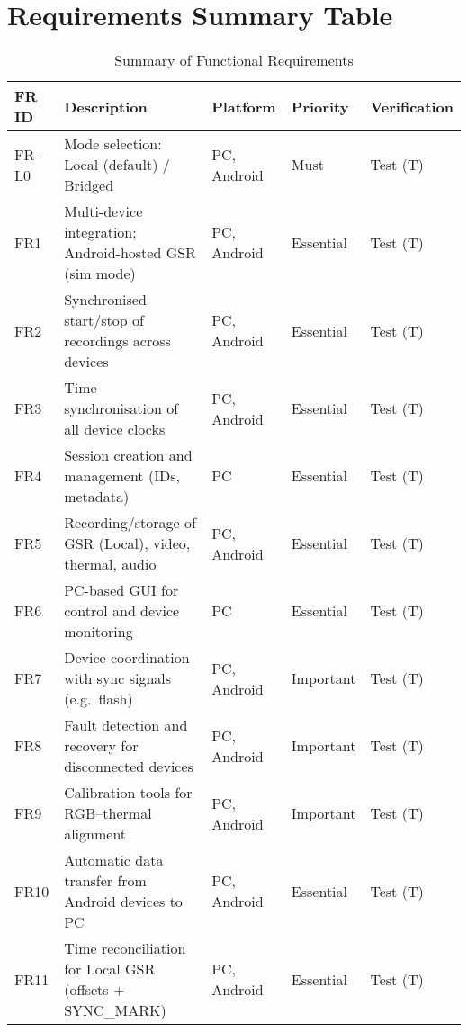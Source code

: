\documentclass{report}
\begin{document}
    \section{Requirements Summary Table}
    \begin{table}[h!]
        \centering
        \caption{Summary of Functional Requirements}
        \label{tab:fr_summary}
        \begin{tabular}{@{}lllll@{}}
            \toprule
            \textbf{FR ID} & \textbf{Description} & \textbf{Platform} & \textbf{Priority} & \textbf{Verification} \\ \midrule
            FR-L0 & Mode selection: Local (default) / Bridged & PC, Android & Must & Test (T) \\
            FR1 & Multi-device integration; Android-hosted GSR (sim mode) & PC, Android & Essential & Test (T) \\
            FR2 & Synchronised start/stop of recordings across devices & PC, Android & Essential & Test (T) \\
            FR3 & Time synchronisation of all device clocks & PC, Android & Essential & Test (T) \\
            FR4 & Session creation and management (IDs, metadata) & PC & Essential & Test (T) \\
            FR5 & Recording/storage of GSR (Local), video, thermal, audio & PC, Android & Essential & Test (T) \\
            FR6 & PC-based GUI for control and device monitoring & PC & Essential & Test (T) \\
            FR7 & Device coordination with sync signals (e.g.\ flash) & PC, Android & Important & Test (T) \\
            FR8 & Fault detection and recovery for disconnected devices & PC, Android & Important & Test (T) \\
            FR9 & Calibration tools for RGB–thermal alignment & PC, Android & Important & Test (T) \\
            FR10 & Automatic data transfer from Android devices to PC & PC, Android & Essential & Test (T) \\
            FR11 & Time reconciliation for Local GSR (offsets + SYNC\_MARK) & PC, Android & Essential & Test (T) \\
            \bottomrule
        \end{tabular}
    \end{table}
\end{document}
